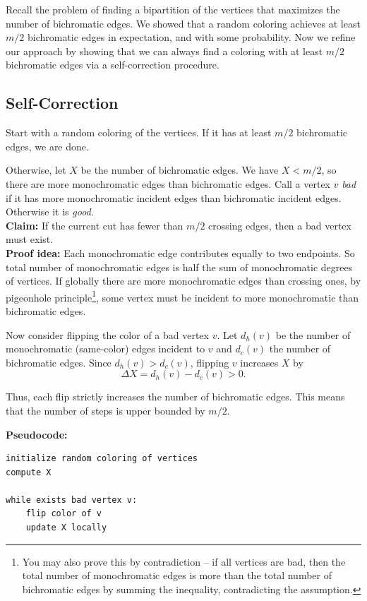 \documentclass[11pt,openany]{book}
\begin{document}
Recall the problem of finding a bipartition of the vertices that maximizes the number of bichromatic edges. 
We showed that a random coloring achieves at least $m/2$ bichromatic edges in expectation, and with some probability. 
Now we refine our approach by showing that we can always find a coloring with at least $m/2$ bichromatic edges via a self-correction procedure.
\subsection{Self-Correction}

Start with a random coloring of the vertices. If it has at least $m/2$ bichromatic edges, we are done. 

Otherwise, let $X$ be the number of bichromatic edges. We have $X < m/2$, so there are more monochromatic edges than bichromatic edges.
Call a vertex $v$ \emph{bad} if it has more monochromatic incident edges than bichromatic incident edges. Otherwise it is \emph{good}.\\

\noindent\textbf{Claim:} If the current cut has fewer than $m/2$ crossing edges, then a bad vertex must exist.\\

\noindent\textbf{Proof idea:} Each monochromatic edge contributes equally to two endpoints.
So total number of monochromatic edges is half the sum of monochromatic degrees of vertices. 
If globally there are more monochromatic edges than crossing ones, 
by pigeonhole principle\footnote{You may also prove this by contradiction -- 
if all vertices are bad, then the total number of monochromatic edges is more than the total number of bichromatic edges by summing the inequality, contradicting the assumption.}, 
some vertex must be incident to more monochromatic than bichromatic edges.

Now consider flipping the color of a bad vertex $v$. Let $d_h(v)$ be the number of monochromatic (same-color) edges incident to $v$ and $d_c(v)$ the number of bichromatic edges. Since $d_h(v)>d_c(v)$, flipping $v$ increases $X$ by
\[
\Delta X = d_h(v)-d_c(v) > 0.
\]

Thus, each flip strictly increases the number of bichromatic edges. This means that the 
number of steps is upper bounded by $m/2$. 

\noindent\textbf{Pseudocode:}
\begin{verbatim}
initialize random coloring of vertices
compute X

while exists bad vertex v:
    flip color of v
    update X locally
\end{verbatim}
\end{document}
